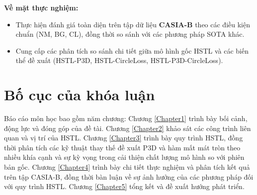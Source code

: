 \textbf{Về mặt thực nghiệm:}
\begin{itemize}
    \item Thực hiện đánh giá toàn diện trên tập dữ liệu \textbf{CASIA-B} theo các điều kiện chuẩn (NM, BG, CL), đồng thời so sánh với các phương pháp SOTA khác.
    \item Cung cấp các phân tích so sánh chi tiết giữa mô hình gốc HSTL và các biến thể đề xuất (HSTL-P3D, HSTL-CircleLoss, HSTL-P3D-CircleLoss).
\end{itemize}

\section{Bố cục của khóa luận}

Báo cáo môn học bao gồm năm chương: Chương \ref{Chapter1} trình bày bối cảnh, động lực và đóng góp của đề tài. Chương \ref{Chapter2} khảo sát các công trình liên quan và vị trí của HSTL. Chương \ref{Chapter3} trình bày quy trình HSTL, đồng thời phân tích các kỹ thuật thay thế đề xuất P3D và hàm mất mát tròn theo nhiều khía cạnh và sự kỳ vọng trong cải thiện chất lượng mô hình so với phiên bản gốc. Chương \ref{Chapter4} trình bày chi tiết thực nghiệm và phân tích kết quả trên tập CASIA-B, đồng thời bàn luận về sự ảnh hưởng của các phương pháp đối với quy trình HSTL. Chương \ref{Chapter5} tổng kết và đề xuất hướng phát triển.

